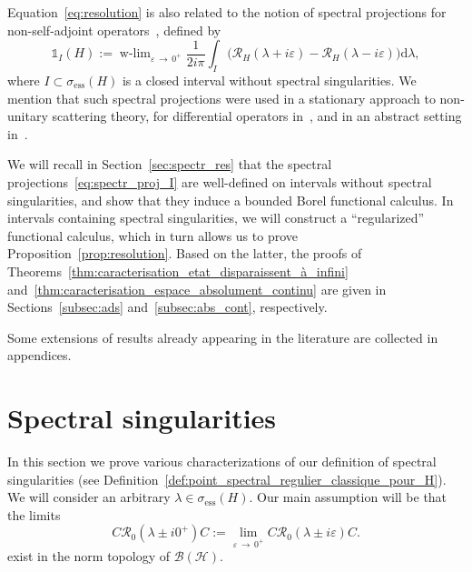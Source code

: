 \documentclass[AHL,Unicode,longabstracts,published]{cedram}
\newcommand{\Hi}{\mathcal{H}}
\newcommand{\ess}{\mathrm{ess}}
\newcommand{\rmd}{\mathrm{d}}
\newcommand{\Res}{\mathcal{R}}
\newcommand{\clB}{\mathcal{B}}
\DeclareMathOperator{\wlim}{w-lim}
\newcommand{\Hi}{\mathcal{H}}
\newcommand{\ess}{\mathrm{ess}}
\begin{document}
Equation~\eqref{eq:resolution} is also related to the notion of spectral projections for non-self-adjoint operators~\cite{DuSc71_01,Du58_01,Sc60_01}, defined by
\begin{equation}\label{eq:spectr_proj_I}
\mathds{1}_I(H) := \wlim_{\varepsilon\,\to\,0^+} \frac{1}{ 2 i \pi } \int_I \big (\Res_H (\lambda + i \varepsilon) - \Res_H (\lambda - i \varepsilon) \big) \rmd  \lambda,
\end{equation}
where $I \subset \sigma_{\ess}(H)$ is a closed interval without spectral singularities. We mention that such spectral projections were used in a stationary approach to non-unitary scattering theory, for differential operators in~\cite{Mo67_01,Mo68_01}, and in an abstract setting in~\cite{Go70_01,Go71_01,Hu71_01}.

We will recall in Section~\ref{sec:spectr_res} that the spectral projections~\eqref{eq:spectr_proj_I} are well-defined on intervals without spectral singularities, and show that they induce a bounded Borel functional calculus. In intervals containing spectral singularities, we will construct a ``regularized'' functional calculus, which in turn allows us to prove Proposition~\ref{prop:resolution}. Based on the latter, the proofs of Theorems~\ref{thm:caracterisation_etat_disparaissent_à_infini} and~\ref{thm:caracterisation_espace_absolument_continu} are given in Sections~\ref{subsec:ads} and~\ref{subsec:abs_cont}, respectively.

Some extensions of results already appearing in the literature are collected in appendices.


\section{Spectral singularities}\label{sec:spectr_sing}


In this section we prove various characterizations of our definition of spectral singularities (see Definition~\ref{def:point_spectral_regulier_classique_pour_H}). We will consider an arbitrary $\lambda\in\sigma_{\ess}(H)$. Our main assumption will be that the limits
\begin{equation}\label{eq:LAP_lambda}
C\Res_0(\lambda\pm i0^+)C:=\lim_{\varepsilon\,\rightarrow\,0^+}C\Res_0(\lambda \pm i\varepsilon)C.
\end{equation}
exist in the norm topology of $\clB(\Hi)$.
\end{document}

